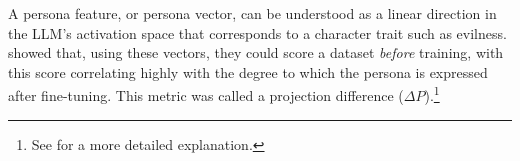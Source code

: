 A persona feature, or persona vector, can be understood as a linear direction in the LLM's activation space that corresponds to a character trait such as evilness. \citet{chen2025persona_vectors} showed that, using these vectors, they could score a dataset \emph{before} training, with this score correlating highly with the degree to which the persona is expressed after fine-tuning. This metric was called a projection difference ($\Delta P$).\footnote{See  for a more detailed explanation.}




